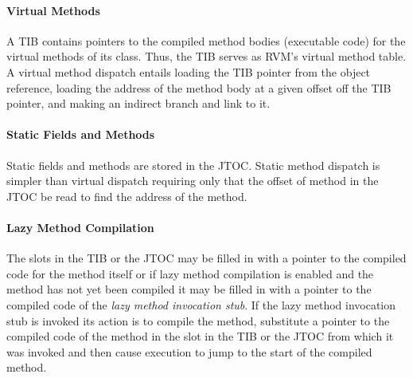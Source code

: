 \paragraph{Virtual Methods}
A TIB contains pointers to the compiled method 
bodies (executable code) for the virtual methods of its class. 
Thus, the TIB serves as RVM's virtual method table.
A virtual method dispatch entails loading the TIB pointer from 
the object reference, loading the address of the method
body at a given offset off the TIB pointer, and making an indirect
branch and link to it.

\paragraph{Static Fields and Methods} 
Static fields and methods are stored in the JTOC. Static method dispatch is 
simpler than virtual dispatch requiring only that the offset of method in the 
JTOC be read to find the address of the method. 

\paragraph{Lazy Method Compilation}
The slots in the TIB or the JTOC may be filled in with 
a pointer to the compiled code for the method itself or if lazy method 
compilation is enabled and the method has not yet been compiled 
it may be filled in with
a pointer to the compiled code of the {\em lazy method invocation stub}.
If the lazy method invocation stub is invoked its action is to compile the 
method, substitute a pointer to the compiled code of the method in the slot in
the TIB or the JTOC from which it was invoked and then 
cause execution to jump to the start of the compiled method. 

